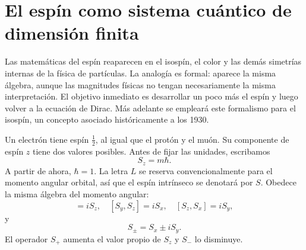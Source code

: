 \begin{classroomqa}
\end{classroomqa}

\section{El espín como sistema cuántico de dimensión finita}

Las matemáticas del espín reaparecen en el isospín, el color y las demás simetrías internas de la física de partículas. La analogía es formal: aparece la misma álgebra, aunque las magnitudes físicas no tengan necesariamente la misma interpretación. El objetivo inmediato es desarrollar un poco más el espín y luego volver a la ecuación de Dirac. Más adelante se empleará este formalismo para el isospín, un concepto asociado históricamente a los 1930.

Un electrón tiene espín \(\tfrac12\), al igual que el protón y el muón. Su componente de espín \(z\) tiene dos valores posibles. Antes de fijar las unidades, escribamos
\begin{equation}
S_z=m\hbar.
\end{equation}
A partir de ahora, \(\hbar=1\). La letra \(L\) se reserva convencionalmente para el momento angular orbital, así que el espín intrínseco se denotará por \(S\). Obedece la misma álgebra del momento angular:
\begin{equation}
[S_x,S_y]=iS_z,
\quad
[S_y,S_z]=iS_x,
\quad
[S_z,S_x]=iS_y,
\end{equation}
y
\begin{equation}
S_\pm=S_x\pm iS_y.
\end{equation}
El operador \(S_+\) aumenta el valor propio de \(S_z\) y \(S_-\) lo disminuye.

\begin{classroomqa}
\end{classroomqa}

